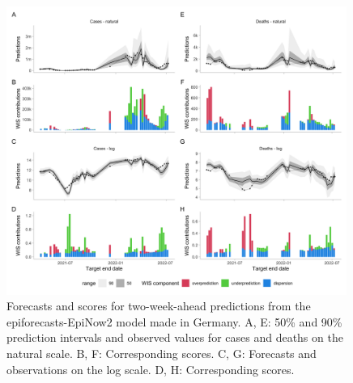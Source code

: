 \documentclass{article}
\begin{document}
\begin{figure}[h!]
    \centering
    \includegraphics[width=0.99\textwidth]{output/figures/HUB-model-comparison-epinow.png}
    \caption{
    Forecasts and scores for two-week-ahead predictions from the epiforecasts-EpiNow2 model \citep{epinow2} made in Germany. A, E: 50\% and 90\% prediction intervals and observed values for cases and deaths on the natural scale. B, F: Corresponding scores. C, G: Forecasts and observations on the log scale. D, H: Corresponding scores. 
    }
    \label{fig:HUB-model-comparison-epinow}
\end{figure}
\end{document}
